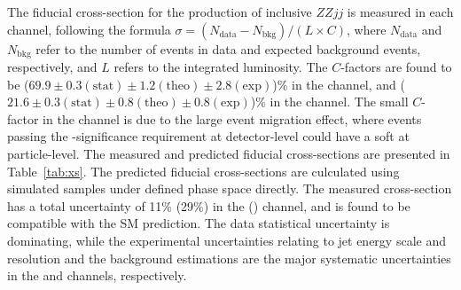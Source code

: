 The fiducial cross-section for the production of inclusive $ZZjj$ is measured in each channel, following the formula $\sigma = (N_{\mathrm{data}} - N_{\mathrm{bkg}}) / (L \times C)$,
where $N_{\mathrm{data}}$ and $N_{\mathrm{bkg}}$ refer to the number of events in data and expected background events, respectively, and $L$ refers to the integrated luminosity.
The $C$-factors are found to be ($69.9 \pm 0.3(\mathrm{stat}) \pm 1.2(\mathrm{theo}) \pm 2.8(\mathrm{exp})$)\% in the \lllljj channel,
and ($21.6 \pm 0.3(\mathrm{stat}) \pm 0.8(\mathrm{theo}) \pm 0.8(\mathrm{exp})$)\% in the \llvvjj channel.
The small $C$-factor in the \llvvjj channel is due to the large event migration effect,
where events passing the \met-significance requirement at detector-level could have a soft \met at particle-level.
The measured and predicted fiducial cross-sections are presented in Table~\ref{tab:xs}.
The predicted fiducial cross-sections are culculated using simulated samples under defined phase space directly.
The measured cross-section has a total uncertainty of 11\% (29\%) in the \lllljj (\llvvjj) channel, and is found to be compatible with the SM prediction.
The data statistical uncertainty is dominating, while the experimental uncertainties relating to jet energy scale and resolution and the background estimations are the major systematic uncertainties in the \lllljj and \llvvjj channels, respectively.

\begin{table}[!htbp]
\begin{center}
\end{center}
\caption{
Measured and predicted fiducial cross-sections in both the \lllljj and \llvvjj channels.
Uncertainties due to different sources are presented.
}
\label{tab:xs}
\end{table}

